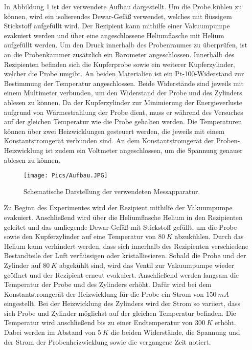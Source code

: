 In Abbildung \ref{fig:Aufbau} ist der verwendete Aufbau dargestellt. Um die Probe
kühlen zu können, wird ein isolierendes Dewar-Gefäß verwendet, welches mit flüssigem
Stickstoff aufgefüllt wird. Der Rezipient kann mithilfe einer Vakuumpumpe evakuiert
werden und über eine angeschlossene Heliumflasche mit Helium aufgefüllt werden.
Um den Druck innerhalb des Probenraumes zu überprüfen, ist an die Probenkammer
zusätzlich ein Barometer angeschlossen.
Innerhalb des Rezipienten befinden sich die Kupferprobe sowie ein weiterer Kupferzylinder,
welcher die Probe umgibt. An beiden Materialien ist ein Pt-100-Widerstand zur
Bestimmung der Temperatur angeschlossen. Beide Widerstände sind jeweils mit einem
Multimeter verbunden, um den Widerstand der Probe und des Zylinders ablesen zu können.
Da der Kupferzylinder zur Minimierung der
Energieverluste aufgrund von Wärmestrahlung der Probe dient, muss er während des
Versuches auf der gleichen Temperatur wie die Probe gehalten werden. Die Temperaturen
können über zwei Heizwicklungen gesteuert werden, die jeweils mit einem Konstantstromgerät
verbunden sind. An dem Konstantstromgerät der Proben-Heizwicklung ist zudem ein
Voltmeter angeschlossen, um die Spannung genauer ablesen zu können.

\begin{figure}
  \centering
  \texttt{[image: Pics/Aufbau.JPG]}
  \caption{Schematische Darstellung der verwendeten Messapparatur\cite{anleitung}.}
  \label{fig:Aufbau}
\end{figure}

Zu Beginn des Experimentes wird der Rezipient mithilfe der Vakuumpumpe evakuiert.
Anschließend wird über die Heliumflasche Helium in den Rezipienten geleitet und das
umliegende Dewar-Gefäß mit Stickstoff gefüllt, um die Probe sowie den Kupferzylinder
auf eine Temperatur von $\SI{80}{K}$ abzukühlen. Durch das Helium kann verhindert
werden, dass sich innerhalb des Rezipienten verschiedene Bestandteile der Luft
verflüssigen oder kristalliesieren. Sobald die Probe und der Zylinder auf $\SI{80}{K}$
abgekühlt sind, wird das Ventil zur Vakuumpumpe wieder geöffnet und der Rezipient
erneut evakuiert. Anschließend werden langsam die Temperatur der Probe und des
Zylinders erhöht. Dafür wird bei dem Konstantstromgerät der Heizwicklung für die
Probe ein Strom von $\SI{150}{mA}$ eingestellt. Bei der Heizwicklung des Zylinders
wird der Strom so variiert, dass sich Probe und Zylinder möglichst auf der gleichen
Temperatur befinden. Die Temperatur wird anschließend bis zu einer Endtemperatur
von $\SI{300}{K}$ erhöht. Dabei werden im Abstand von $\SI{5}{K}$ die beiden Widerstände,
die Spannung und der Strom der Probenheizwicklung sowie die vergangene Zeit notiert.
